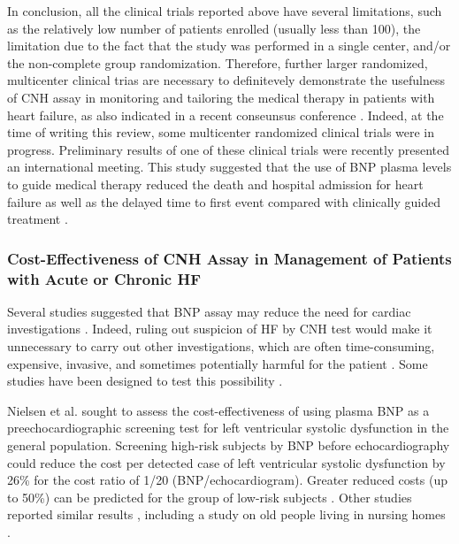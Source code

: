 \documentclass[14pt,a4paper,onecolumn]{extarticle}
\begin{document}
In conclusion, all the clinical trials reported above have several limitations, such as
the relatively low number of patients enrolled (usually less than 100), the limitation
due to the fact that the study was performed in a single center, and/or the non-complete group randomization. Therefore, further larger randomized, multicenter clinical
trias are necessary to definitevely demonstrate the usefulness of CNH assay in monitoring
and tailoring the medical therapy in patients with heart failure, as also indicated in a
recent conseunsus conference \citep{bib3296}. Indeed, at the time of writing this review, some
multicenter randomized clinical trials were in progress. Preliminary results of one of these
clinical trials \citep{bib3297} were recently presented an international meeting. This study suggested that the use of BNP plasma levels to guide medical therapy reduced the death and
hospital admission for heart failure as well as the delayed time to first event compared
with clinically guided treatment \citep{bib3297}.


\subsubsection{ Cost-Effectiveness of CNH Assay in Management of Patients with Acute or Chronic HF}

Several studies suggested that BNP assay may reduce the need for cardiac investigations \citep{bib365} \citep{bib369} \citep{bib3145} \citep{bib3147} \citep{bib3175}. Indeed, ruling out suspicion of HF by CNH test would make
it unnecessary to carry out other investigations, which are often time-consuming, expensive, invasive, and sometimes potentially harmful for the patient \citep{bib365} \citep{bib369}. Some studies
have been designed to test this possibility \citep{bib392} \citep{bib393} \citep{bib394} \citep{bib3147} \citep{bib3263} \citep{bib3264} \citep{bib3265}.

Nielsen et al. \citep{bib392} sought to assess the cost-effectiveness of using plasma BNP as a preechocardiographic screening test for left ventricular systolic dysfunction in the general population. Screening high-risk subjects by BNP before echocardiography could
reduce the cost per detected case of left ventricular systolic dysfunction by 26\% for the
cost ratio of 1/20 (BNP/echocardiogram). Greater reduced costs (up to 50\%) can be
predicted for the group of low-risk subjects \citep{bib392}. Other studies reported similar results
\citep{bib393} \citep{bib3145}, including a study on old people living in nursing homes \citep{bib3147}.
\end{document}
